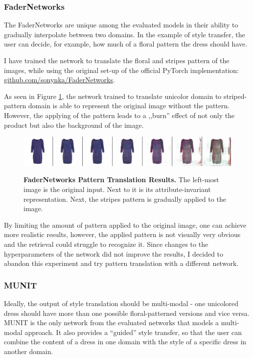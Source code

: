 \documentclass[12pt]{report}
\begin{document}
\subsubsection{FaderNetworks}
The FaderNetworks are unique among the evaluated models in their ability to gradually interpolate between two domains. In the example of style transfer, the user can decide, for example, how much of a floral pattern the dress should have.

I have trained the network to translate the floral and stripes pattern of the images, while using the original set-up of the official PyTorch implementation: \linebreak \hyperlink{https://github.com/sonynka/FaderNetworks}{github.com/sonynka/FaderNetworks}.

As seen in Figure \ref{fig:fader_results}, the network trained to translate unicolor domain to striped-pattern domain is able to represent the original image without the pattern. However, the applying of the pattern leads to a ,,burn'' effect of not only the product but also the background of the image.

\begin{figure}[h]
\centering
{\includegraphics[width=\linewidth]{04_experiments/fader}}
\caption{\label{fig:fader_results} \textbf{FaderNetworks Pattern Translation Results.} The left-most image is the original input. Next to it is its attribute-invariant representation. Next, the stripes pattern is gradually applied to the image.}
\end{figure}

By limiting the amount of pattern applied to the original image, one can achieve more realistic results, however, the applied pattern is not visually very obvious and the retrieval could struggle to recognize it. Since changes to the hyperparameters of the network did not improve the results, I decided to abandon this experiment and try pattern translation with a different network.

\subsubsection{MUNIT}
Ideally, the output of style translation should be multi-modal - one unicolored dress should have more than one possible floral-patterned versions and vice versa. MUNIT is the only network from the evaluated networks that models a multi-modal approach. It also provides a ``guided'' style transfer, so that the user can combine the content of a dress in one domain with the style of a specific dress in another domain.
\end{document}
